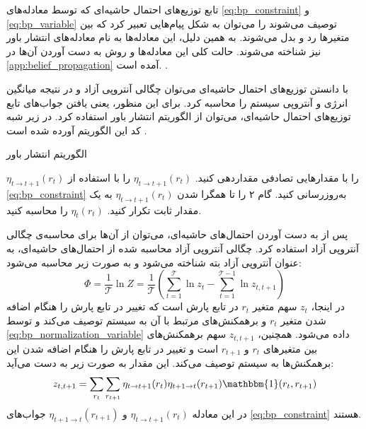 تابع توزیع‌های احتمال حاشیه‌ای که توسط معادله‌های
\ref{eq:bp_constraint} و \ref{eq:bp_variable}
توصیف می‌شوند را می‌توان به شکل پیام‌هایی تعبیر کرد که بین متغیرها رد و بدل می‌شوند.
به همین دلیل، این معادله‌ها به نام معادله‌های انتشار باور نیز شناخته می‌شوند.
حالت کلی این معادله‌ها و روش به دست آوردن آن‌ها در
\ref{app:belief_propagation}
آمده است.
\cite{yedidia2005,mezard2009,zdeborova2016}.

با دانستن توزیع‌های احتمال حاشیه‌ای می‌توان چگالی آنتروپی آزاد و در نتیجه میانگین انرژی و آنتروپی سیستم را محاسبه کرد.
برای این منظور، یعنی یافتن جواب‌های تابع توزیع‌های احتمال حاشیه‌ای، می‌توان از الگوریتم انتشار باور استفاده کرد.
در زیر شبه کد این الگوریتم آورده شده است
\cite{zdeborova2016}.
\begin{algorithm}[H]
    \caption{الگوریتم انتشار باور}
    \begin{algorithmic}[1]
        \STATE \( \eta_{t \to t+1}(r_{t}) \)
        را با مقدار‌هایی تصادفی مقداردهی کنید.
        \STATE \( \eta_{t \to t+1}(r_{t}) \)
        را با استفاده از
        \autoref{eq:bp_constraint}
        به‌روزرسانی کنید.
        \STATE گام ۲ را تا همگرا شدن
        \( \eta_{t \to t+1}(r_{t}) \)
        به یک مقدار ثابت تکرار کنید.
        \STATE \( \eta_{t}(r_{t}) \)
        را محاسبه کنید.
    \end{algorithmic}
\end{algorithm}

پس از به دست آوردن احتمال‌های حاشیه‌ای، می‌توان از آن‌ها برای محاسبه‌ی چگالی آنتروپی آزاد استفاده کرد.
چگالی آنتروپی آزاد محاسبه شده از احتمال‌های حاشیه‌ای، به عنوان آنتروپی آزاد بته شناخته می‌شود و به صورت زیر محاسبه می‌شود:
\begin{equation} \label{eq:bethe_free_energy}
    \Phi = \frac{1}{\mathcal{\mathcal{T}}} \ln Z = \frac{1}{\mathcal{\mathcal{T}}} \left( \sum_{t=1}^{\mathcal{\mathcal{T}}} \ln z_{t} - \sum_{t=1}^{\mathcal{\mathcal{T}}-1} \ln z_{t,t+1} \right)
\end{equation}
در اینجا،
\( z_{t} \)
سهم متغیر
\( r_{t} \)
در تابع پارش است که تغییر در تابع پارش را هنگام اضافه شدن متغیر
\( r_{t} \)
و برهمکنش‌های مرتبط با آن به سیستم توصیف می‌کند و توسط
\autoref{eq:bp_normalization_variable}
داده می‌شود.
همچنین،
\( z_{t,t+1} \)
سهم برهمکنش‌های بین متغیرهای
\( r_{t} \) و \( r_{t+1} \)
است و تغییر در تابع پارش را هنگام اضافه شدن این برهمکنش‌ها به سیستم توصیف می‌کند.
این مقدار به صورت زیر به دست می‌آید:
\begin{equation} \label{eq:partial_partition_function}
    z_{t,t+1} = \sum_{r_{t}} \sum_{r_{t+1}} \eta_{t \to t+1}(r_{t}) \eta_{t+1 \to t}(r_{t+1}) \mathbbm{1}(r_{t},r_{t+1})
\end{equation}
در این معادله
\( \eta_{t \to t+1}(r_{t}) \) و \( \eta_{t+1 \to t}(r_{t+1}) \)
جواب‌های
\autoref{eq:bp_constraint}
هستند.

